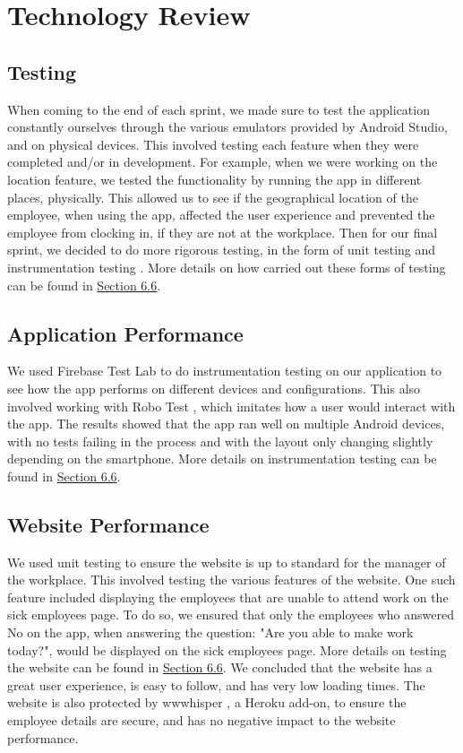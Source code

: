 \chapter{Technology Review}
\section{Testing}
When coming to the end of each sprint, we made sure to test the application constantly ourselves through the various emulators provided by Android Studio, and on physical devices. This involved testing each feature when they were completed and/or in development. For example, when we were working on the location feature, we tested the functionality by running the app in different places, physically. This allowed us to see if the geographical location of the employee, when using the app, affected the user experience and prevented the employee from clocking in, if they are not at the workplace. Then for our final sprint, we decided to do more rigorous testing, in the form of unit testing \cite{unittest} and instrumentation testing \cite{instrumentationtest}. More details on how carried out these forms of testing can be found in \hyperref[sec:Testing]{Section 6.6}.

\section{Application Performance}
We used Firebase Test Lab \cite{firebasetestlab} to do instrumentation testing on our application to see how the app performs on different devices and configurations. This also involved working with Robo Test \cite{robotest}, which imitates how a user would interact with the app. The results showed that the app ran well on multiple Android devices, with no tests failing in the process and with the layout only changing slightly depending on the smartphone. More details on instrumentation testing can be found in \hyperref[sec:Testing]{Section 6.6}.

\section{Website Performance}
We used unit testing \cite{unittest} to ensure the website is up to standard for the manager of the workplace. This involved testing the various features of the website. One such feature included displaying the employees that are unable to attend work on the sick employees page. To do so, we ensured that only the employees who answered No on the app, when answering the question: "Are you able to make work today?", would be displayed on the sick employees page. More details on testing the website can be found in \hyperref[sec:Testing]{Section 6.6}. We concluded that the website has a great user experience, is easy to follow, and has very low loading times. The website is also protected by wwwhisper \cite{wwwhisper}, a Heroku add-on, to ensure the employee details are secure, and has no negative impact to the website performance.

